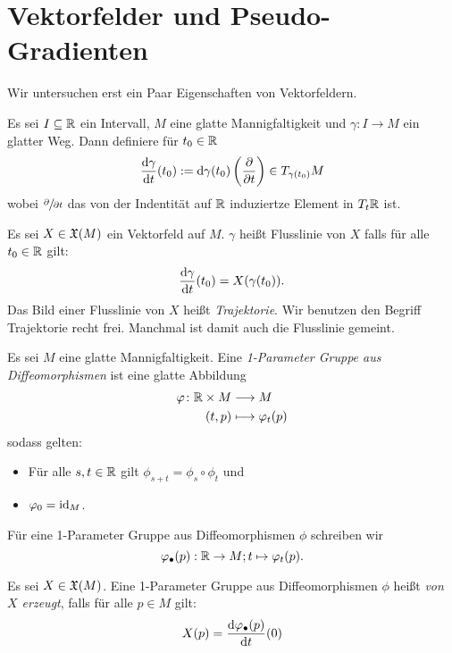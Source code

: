 \section{Vektorfelder und Pseudo-Gradienten}

Wir untersuchen erst ein Paar Eigenschaften von Vektorfeldern.

\begin{definition}[Flusslinie]
    \label{def: flussliene}
    Es sei $I \subseteq { \mathbb R }$ ein Intervall, $M$ eine glatte Mannigfaltigkeit und  
    $\gamma \colon I  \to M$ ein glatter Weg. Dann definiere für $t_0 \in { \mathbb R }$
    \[ \derive[\gamma]{t} (t_0) := 
        \opd \gamma (t_0) \left( \pderive{t} \right) \in T_{\gamma(t_0)}M \]
    wobei $\pderive{t}$ das von der Indentität auf ${ \mathbb R }$ induziertze Element in $T_t{ \mathbb R }$ ist.

    Es sei $X \in { \mathfrak{X} } (M)$ ein Vektorfeld auf $M$. $\gamma$ heißt Flusslinie von $X$
    falls für alle $t_0 \in { \mathbb R }$ gilt: 
    \[ \derive[\gamma]{t}(t_0) = X(\gamma(t_0)) . \]
    Das Bild einer Flusslinie von $X$ heißt \textit{Trajektorie}. Wir benutzen den Begriff 
    Trajektorie recht frei. Manchmal ist damit auch die Flusslinie gemeint.
\end{definition}

\begin{definition}
    \label{def: 1-parameter gruppe aus diffeos}
    Es sei $M$ eine glatte Mannigfaltigkeit. Eine 
    \textit{1-Parameter Gruppe aus Diffeomorphismen} ist eine glatte Abbildung
    \begin{align*}
        \varphi \colon { \mathbb R } \times M \longrightarrow & \; M \\
        (t, p) \longmapsto & \; \varphi_t(p)
    \end{align*}
    sodass gelten: 
    \begin{itemize}
        \item Für alle $s, t \in { \mathbb R }$ gilt $\phi_{s + t} = \phi_s \circ \phi_t$ und
        \item $\varphi_0 = { \operatorname{id} }_{M}$.
    \end{itemize}

    Für eine 1-Parameter Gruppe aus Diffeomorphismen $\phi$ schreiben wir 
    \[ \varphi_{\bullet}(p): { \mathbb R } \to M ; t \mapsto \varphi_t(p) . \]

    Es sei $X \in { \mathfrak{X} } (M)$. Eine 1-Parameter Gruppe aus Diffeomorphismen $\phi$ heißt 
    \textit{von $X$ erzeugt}, falls für alle $p \in M$ gilt:
    \[ X(p) = \derive[\phi_{\bullet}(p)]{t}(0) \]
\end{definition}

